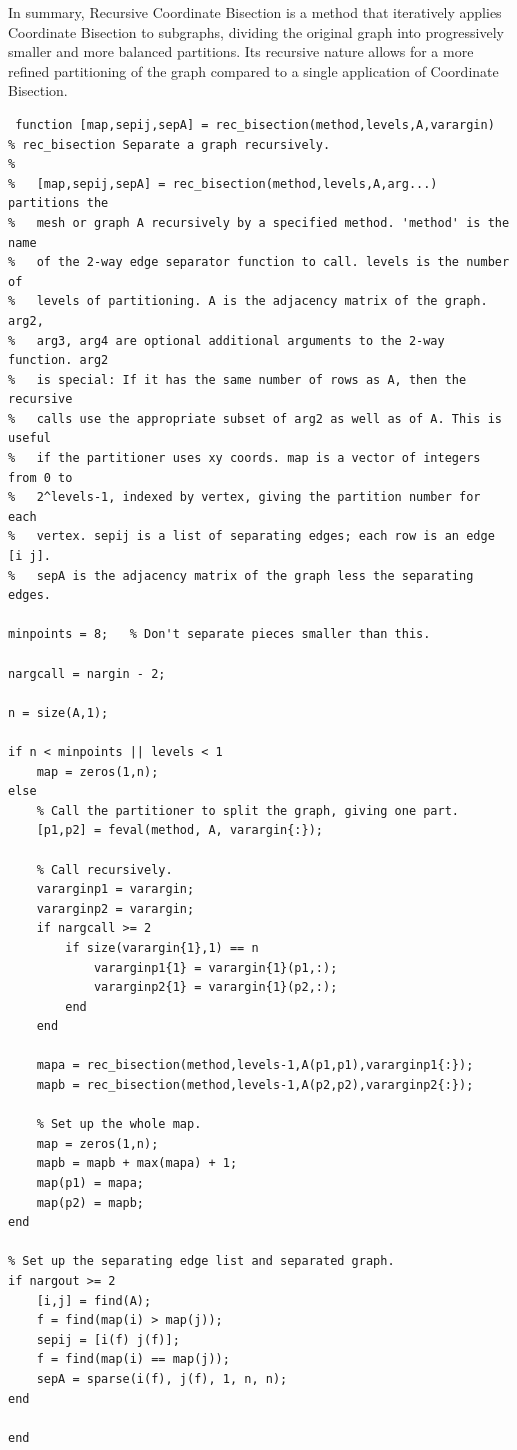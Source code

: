 \documentclass[unicode,11pt,a4paper,oneside,numbers=endperiod,openany]{scrartcl}
\begin{document}
In summary, Recursive Coordinate Bisection is a method that iteratively applies Coordinate Bisection to subgraphs, dividing the original graph into progressively smaller and more balanced partitions. Its recursive nature allows for a more refined partitioning of the graph compared to a single application of Coordinate Bisection.
\begin{lstlisting}
 function [map,sepij,sepA] = rec_bisection(method,levels,A,varargin)
% rec_bisection Separate a graph recursively.
%
%   [map,sepij,sepA] = rec_bisection(method,levels,A,arg...) partitions the
%   mesh or graph A recursively by a specified method. 'method' is the name
%   of the 2-way edge separator function to call. levels is the number of
%   levels of partitioning. A is the adjacency matrix of the graph. arg2,
%   arg3, arg4 are optional additional arguments to the 2-way function. arg2
%   is special: If it has the same number of rows as A, then the recursive
%   calls use the appropriate subset of arg2 as well as of A. This is useful
%   if the partitioner uses xy coords. map is a vector of integers from 0 to
%   2^levels-1, indexed by vertex, giving the partition number for each
%   vertex. sepij is a list of separating edges; each row is an edge [i j].
%   sepA is the adjacency matrix of the graph less the separating edges.

minpoints = 8;   % Don't separate pieces smaller than this.

nargcall = nargin - 2;

n = size(A,1);

if n < minpoints || levels < 1
    map = zeros(1,n);
else
    % Call the partitioner to split the graph, giving one part.
    [p1,p2] = feval(method, A, varargin{:});

    % Call recursively.
    vararginp1 = varargin;
    vararginp2 = varargin;
    if nargcall >= 2
        if size(varargin{1},1) == n
            vararginp1{1} = varargin{1}(p1,:);
            vararginp2{1} = varargin{1}(p2,:);
        end
    end

    mapa = rec_bisection(method,levels-1,A(p1,p1),vararginp1{:});
    mapb = rec_bisection(method,levels-1,A(p2,p2),vararginp2{:});

    % Set up the whole map.
    map = zeros(1,n);
    mapb = mapb + max(mapa) + 1;
    map(p1) = mapa;
    map(p2) = mapb;
end

% Set up the separating edge list and separated graph.
if nargout >= 2
    [i,j] = find(A);
    f = find(map(i) > map(j));
    sepij = [i(f) j(f)];
    f = find(map(i) == map(j));
    sepA = sparse(i(f), j(f), 1, n, n);
end

end
\end{lstlisting}
\end{document}
